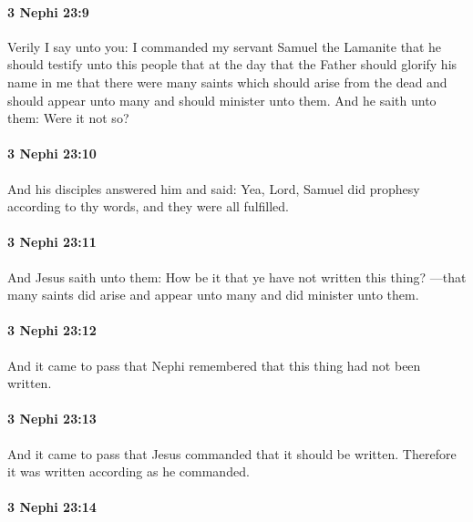 		\paragraph{3 Nephi 23:9} %
			\label{3NEPHI-23-9}

			Verily I say unto you:
			I commanded my servant Samuel the Lamanite
			that he should testify unto this people
			that at the day that the Father should glorify his name in me
			that there were many saints which should arise from the dead
			and should appear unto many and should minister unto them.
			And he saith unto them:
			Were it not so?

		\paragraph{3 Nephi 23:10} %
			\label{3NEPHI-23-10}

			And his disciples answered him and said:
			Yea, Lord, Samuel did prophesy according to thy words,
			and they were all fulfilled.

		\paragraph{3 Nephi 23:11} %
			\label{3NEPHI-23-11}

			And Jesus saith unto them:
			How be it that ye have not written this thing?
			---that many saints did arise and appear unto many
			and did minister unto them.

		\paragraph{3 Nephi 23:12} %
			\label{3NEPHI-23-12}

			And it came to pass that Nephi remembered
			that this thing had not been written.

		\paragraph{3 Nephi 23:13} %
			\label{3NEPHI-23-13}

			And it came to pass that Jesus commanded that it should be written.
			Therefore it was written according as he commanded.

		\paragraph{3 Nephi 23:14} %
			\label{3NEPHI-23-14}

